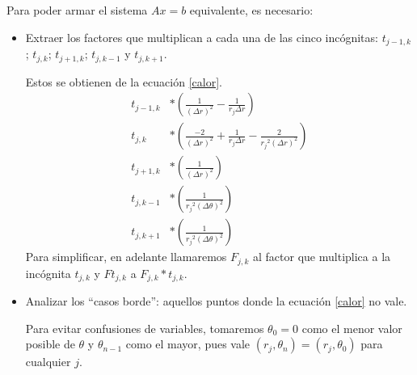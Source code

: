 Para poder armar el sistema $Ax=b$ equivalente, es necesario:
\begin{itemize}
 \item
    Extraer los factores que multiplican a cada una de las cinco incógnitas: $t_{j-1,k}$; $t_{j,k}$; $t_{j+1,k}$; $t_{j,k-1}$ y $t_{j,k+1}$.

    Estos se obtienen de la ecuación \ref{calor}.
    \begin{align*}
        t_{j-1, k}&*(\frac{1}{(\Delta r)^2} - \frac{1}{r_j \Delta r}) \\
        t_{j, k}  &*(\frac{-2}{(\Delta r)^2} + \frac{1}{r_j \Delta r} - \frac{2}{{r_j}^2 (\Delta r)^2}) \\
        t_{j+1, k}&*(\frac{1}{(\Delta r)^2}) \\
        t_{j, k-1}&*(\frac{1}{{r_j}^2(\Delta \theta)^2}) \\
        t_{j, k+1}&*(\frac{1}{{r_j}^2(\Delta \theta)^2})
    \end{align*}
    Para simplificar, en adelante llamaremos $F_{j,k}$ al factor que multiplica a la incógnita $t_{j,k}$ y $Ft_{j,k}$ a $F_{j,k}*t_{j,k}$.
 \item
    Analizar los ``casos borde'': aquellos puntos donde la ecuación \ref{calor} no vale.
    
    Para evitar confusiones de variables, tomaremos $\theta_0 = 0$ como el menor valor posible de $\theta$ y $\theta_{n-1}$ como el mayor, pues vale $(r_j, \theta_n) = (r_j, \theta_0)$ para cualquier $j$. 
    

\end{itemize}
